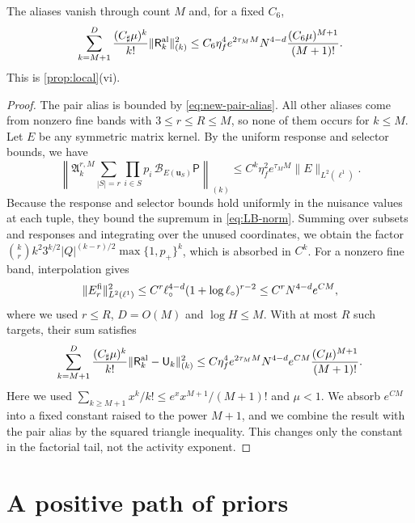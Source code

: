 \begin{lemma}\label{lem:alias}
The aliases vanish through count $M$ and, for a fixed $C_6$,
\[
 \sum_{k=M+1}^D\frac{(C_\sharp\mu)^k}{k!}
 \|\mathsf R_k^{\rm al}\|_{(k)}^2
 \le C_6\eta_f^4e^{2\tau_MM}N^{4-d}
       \frac{(C_6\mu)^{M+1}}{(M+1)!}.
\]
This is \cref{prop:local}(vi).
\end{lemma}
\begin{proof}
The pair alias is bounded by \eqref{eq:new-pair-alias}.
All other aliases come from nonzero fine bands with $3\le r\le R\le M$,
so none of them occurs for $k\le M$. Let $E$ be any symmetric matrix
kernel. By the uniform response and selector bounds, we have
\begin{equation}\label{eq:LB-subset-lift}
 \left\|\mathfrak A_k^{r,M}\sum_{|S|=r}\prod_{i\in S}p_i\,
 \mathcal B_{E(\mathbf u_S)}\mathsf P\right\|_{(k)}
 \le C^k\eta_f^2e^{\tau_MM}\|E\|_{L^2(\ell^1)}.
\end{equation}
Because the response and selector bounds hold uniformly in the
nuisance values at each tuple, they bound the supremum in
\eqref{eq:LB-norm}. Summing over subsets and responses and integrating
over the unused coordinates, we obtain the factor
$\binom kr k^2 3^{k/2}|Q|^{(k-r)/2}\max\{1,p_+\}^k$, which is absorbed
in $C^k$.
For a nonzero fine band, interpolation gives
\[
 \|E_r^{\rm fi}\|_{L^2(\ell^1)}^2
 \le C^r\ell_\circ^{4-d}(1+\log\ell_\circ)^{r-2}
 \le C^rN^{4-d}e^{C M},
\]
where we used $r\le R$, $D=O(M)$ and $\log H\le M$.
With at most $R$ such targets, their sum satisfies
\[
 \sum_{k=M+1}^D\frac{(C_\sharp\mu)^k}{k!}
 \|\mathsf R_k^{\rm al}-\mathsf U_k\|_{(k)}^2
 \le C\eta_f^4e^{2\tau_MM}N^{4-d}e^{C M}
       \frac{(C\mu)^{M+1}}{(M+1)!}.
\]
Here we used $\sum_{k\ge M+1}x^k/k!\le e^xx^{M+1}/(M+1)!$ and $\mu<1$.
We absorb $e^{C M}$ into a fixed constant raised to the power $M+1$, and
we combine the result with the pair alias by the squared triangle
inequality. This changes only the constant in the factorial tail, not
the activity exponent.
\end{proof}
\section{A positive path of priors}\label{sec:LB-heaps}


